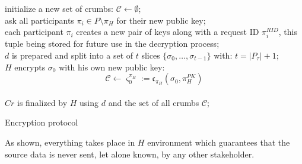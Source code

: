 \documentclass[twoside,twocolumn]{article}
\theoremstyle{definition}
\theoremstyle{remark}
\begin{document}
\begin{algorithm}
    initialize a new set of crumbs: $\mathcal{C} \gets \emptyset$; \\
    ask all participants $\pi_i \in P \setminus {\pi_H}$ for their new public key; \\
    each participant $\pi_i$ creates a new pair of keys along with a request ID $\pi_i^{RID}$, this tuple being stored for future use in the decryption 
        process; \\
    $d$ is prepared and split into a set of $t$ slices $\{ \sigma_0, \dots, \sigma_{t-1} \}$ with: $t = |P_\tau| + 1$; \\
    $H$ encrypts $\sigma_0$ with his own new public key:
    \begin{equation}
        \label{eq:crumb0}
        \mathcal{C} \gets \varsigma_0^{\pi_H} := \mathfrak{c}_{\pi_H}(\sigma_0, \pi_H^{PK})
    \end{equation} \\
    $Cr$ is finalized by $H$ using $d$ and the set of all crumbs $\mathcal{C}$; \\
    \caption{Encryption protocol}
    \label{algo:encryption}
\end{algorithm}

As shown, everything takes place in $H$ environment which guarantees that the source data is never sent, let alone known, by any other stakeholder.
\end{document}
